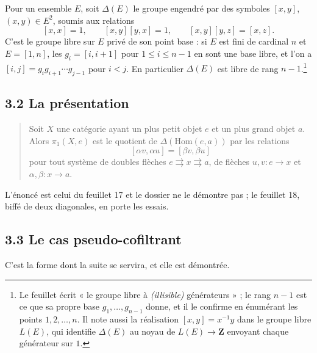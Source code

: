 \documentclass[11pt,a4paper]{article}
\begin{document}
Pour un ensemble $E$, soit $\Delta(E)$ le groupe engendré par des symboles
$[x,y]$, $(x,y) \in E^{2}$, soumis aux relations
\[
  [x,x] = 1, \qquad [x,y][y,x] = 1, \qquad [x,y][y,z] = [x,z].
\]
C'est le groupe libre sur $E$ privé de son point base : si $E$ est fini de
cardinal $n$ et $E = [1,n]$, les $g_{i} = [i,i+1]$ pour $1 \le i \le n-1$ en
sont une base libre, et l'on a $[i,j] = g_{i}g_{i+1} \cdots g_{j-1}$ pour
$i < j$. En particulier $\Delta(E)$ est libre de rang $n-1$.\footnote{Le
feuillet écrit « le groupe libre à \emph{(illisible)} générateurs » ; le rang
$n-1$ est ce que sa propre base $g_{1}, \ldots, g_{n-1}$ donne, et il le
confirme en énumérant les points $1, 2, \ldots, n$. Il note aussi la
réalisation $[x,y] = x^{-1}y$ dans le groupe libre $L(E)$, qui identifie
$\Delta(E)$ au noyau de $L(E) \to \mathbf{Z}$ envoyant chaque générateur sur
$1$.}

\subsection*{3.2 La présentation}

\begin{quote}
Soit $X$ une catégorie ayant un plus petit objet $e$ et un plus grand objet
$a$. Alors $\pi_{1}(X,e)$ est le quotient de $\Delta(\mathrm{Hom}(e,a))$ par
les relations
\[
  [\alpha v, \alpha u] = [\beta v, \beta u]
\]
pour tout système de doubles flèches $e \rightrightarrows x \rightrightarrows a$,
de flèches $u, v : e \to x$ et $\alpha, \beta : x \to a$.
\end{quote}

L'énoncé est celui du feuillet 17 et le dossier ne le démontre pas ; le
feuillet 18, biffé de deux diagonales, en porte les essais.

\subsection*{3.3 Le cas pseudo-cofiltrant}

C'est la forme dont la suite se servira, et elle est démontrée.
\end{document}
